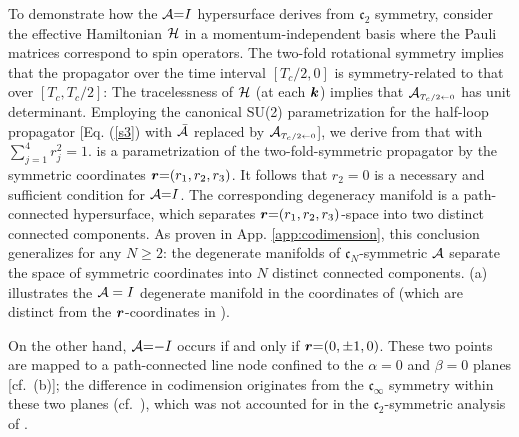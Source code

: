 \documentclass[aps, showpacs, twocolumn, notitlepage, superscriptaddress]{revtex4-1}
\begin{document}
To demonstrate how the ${\cal A}{=}I$ hypersurface derives from $\mathfrak{c}_2$ symmetry, consider  the effective Hamiltonian ${\cal H}$ 
in a momentum-independent basis where the Pauli matrices correspond to spin operators. The two-fold rotational symmetry 
implies that the propagator over the time interval $[T_c/2,0]$ is symmetry-related to that over $[T_c,T_c/2]$:
The tracelessness of ${\cal H}$ (at each $\boldsymbol{k}$) implies that  ${{\cal A}}_{\scriptscriptstyle{T_c/2\leftarrow 0}}$  has unit determinant. Employing the canonical SU(2) parametrization for the half-loop propagator [Eq. (\ref{s3}) with ${\cal \bar{A}}$ replaced by ${{\cal A}}_{\scriptscriptstyle{T_c/2\leftarrow 0}}$], we derive from  that
with $\sum_{j=1}^4r_j^2{=}1$.  is a parametrization of the two-fold-symmetric propagator by the symmetric coordinates $\boldsymbol{r}{=}(r_1,r_2,r_3)$. It follows that $r_2{=}0$ is a necessary and sufficient condition for ${\cal A}{=}I$. The corresponding degeneracy manifold is a path-connected hypersurface, which separates $\boldsymbol{r}{=}(r_1,r_2,r_3)$-space into two distinct connected components. As proven in App. \ref{app:codimension}, this conclusion generalizes for any $N{\geq}2$: the degenerate manifolds of $\mathfrak{c}_N$-symmetric ${\cal A}$ separate the space of symmetric coordinates into $N$ distinct connected components. (a) illustrates the ${\cal A}=I$ degenerate manifold {in the coordinates of   (which are distinct from the $\boldsymbol{r}$-coordinates in ).} 

On the other hand, ${\cal A}{=}{-}I$ occurs if and only if $\boldsymbol{r}{=}(0,{\pm} 1,0)$. These two points are mapped to a path-connected line node confined to the $\alpha{=}0$ and $\beta{=}0$ planes [cf.\ (b)]; the difference in codimension originates from the $\mathfrak{c}_{\infty}$ symmetry within these two planes (cf.\ ), which was not accounted for in the $\mathfrak{c}_2$-symmetric analysis of .

\end{document}

